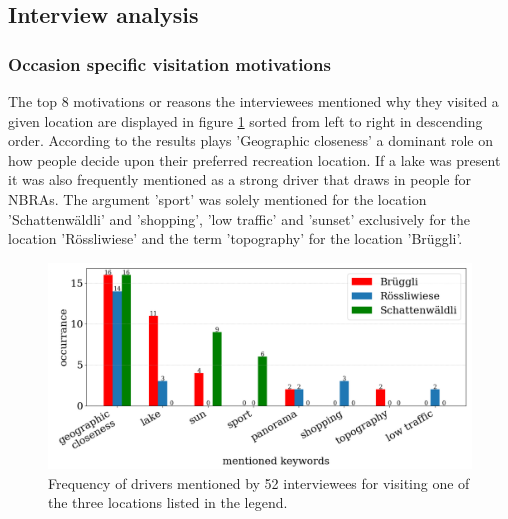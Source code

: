 \subsection{Interview analysis}

\subsubsection{Occasion specific visitation motivations}
The top 8 motivations or reasons the interviewees mentioned why they visited a given location are displayed in figure \ref{fig:interview_visitation_motivation} sorted from left to right in descending order. According to the results plays 'Geographic closeness' a dominant role on how people decide upon their preferred recreation location. If a lake was present it was also frequently mentioned as a strong driver that draws in people for NBRAs. The argument 'sport' was solely mentioned for the location 'Schattenw\"aldli' and 'shopping', 'low traffic' and 'sunset' exclusively for the location 'R\"ossliwiese' and the term 'topography' for the location 'Br\"uggli'.

\begin{figure}[h!]
   \centering
   \includegraphics[width=\textwidth]{img/interview_keywords.pdf}
   \caption{Frequency of drivers mentioned by 52 interviewees for visiting one of the three locations listed in the legend.}
   \label{fig:interview_visitation_motivation}
\end{figure}

